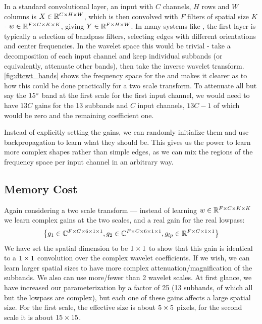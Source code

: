 In a standard convolutional layer, an input with $C$ channels, $H$ rows and $W$ columns is $X \in
\reals[C\x H\x W]$, which is then convolved with $F$ filters of spatial size $K$ - $w \in \reals[F
\x C\x K\x K]$, giving $Y \in \reals[F\x H\x W]$. In many systems like
\cite{krizhevsky_imagenet_2012, he_deep_2015}, the first layer is typically a selection of bandpass
filters, selecting edges with different orientations and center frequencies. In the wavelet space
this would be trivial - take a decomposition of each input channel and keep individual subbands (or
equivalently, attenuate other bands), then take the inverse wavelet transform.
\autoref{fig:dtcwt_bands} shows the frequency space for the \DTCWT and makes it clearer as to how
this could be done practically for a two scale transform. To attenuate all but say the $15 \degs$
band at the first scale for the first input channel, we would need to have $13C$ gains for the 13
subbands and $C$ input channels, $13C-1$ of which would be zero and the remaining coefficient one.

Instead of explicitly setting the gains, we can randomly initialize them and use backpropagation to
learn what they should be. This gives us the power to learn more complex shapes rather than simple
edges, as we can mix the regions of the frequency space per input channel in an arbitrary way. 

\subsection{Memory Cost}
Again considering a two scale transform --- instead of learning $w\in \reals[F \x C\x K\x K]$ we
learn complex gains at the two scales, and a real gain for the real lowpass:
$$\left\{g_1 \in \complexes[F\x C\x 6\x 1\x 1], g_2 \in \complexes[F\x C\x 6\x 1\x 1], g_{lp} \in \reals[F\x C\x 1\x 1]
  \right\}$$ 
We have set the spatial dimension to be $1\x 1$ to show that this gain is identical to a $1\x 1$ 
convolution over the complex wavelet coefficients. If we wish, we can learn larger spatial sizes to have more complex
attenuation/magnification of the subbands. We also can use more/fewer than 2 wavelet scales.  At first
glance, we have increased our parameterization by a factor of 25 (13 subbands, of which all but the
lowpass are complex), but each one of these gains affects a large spatial size. For the first scale,
the effective size is about $5\x 5$ pixels, for the second scale it is about $15\x 15$.

